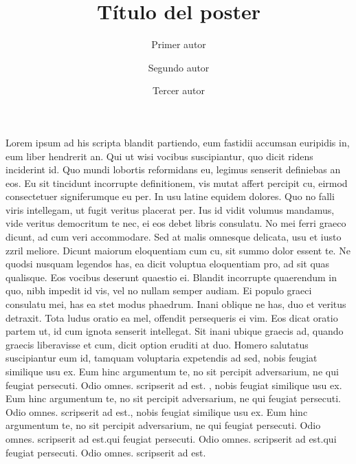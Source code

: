 \documentclass[11pt,a4paper]{article}
\title{\vspace{-5ex}Título del poster}	%
\author[1,2]{Primer autor}
\author[1]{Segundo autor}
\author[2]{Tercer autor}
\affil[1]{Afiliación uno}
\affil[2]{Afiliación dos\vspace{1ex}}	%
\affil[ ]{\texttt{email@decontacto}\vspace{-4ex}}	%
\date{}
\begin{document}
  \maketitle
  \thispagestyle{empty}

\begin{multicols}{2}

Lorem ipsum ad his scripta blandit partiendo, eum fastidii accumsan euripidis in, eum liber hendrerit an. Qui ut wisi vocibus suscipiantur, quo dicit ridens inciderint id. Quo mundi lobortis reformidans eu, legimus senserit definiebas an eos. Eu sit tincidunt incorrupte definitionem, vis mutat affert percipit cu, eirmod consectetuer signiferumque eu per. In usu latine equidem dolores. Quo no falli viris intellegam, ut fugit veritus placerat per. Ius id vidit volumus mandamus, vide veritus democritum te nec, ei eos debet libris consulatu. No mei ferri graeco dicunt, ad cum veri accommodare. Sed at malis omnesque delicata, usu et iusto zzril meliore. Dicunt maiorum eloquentiam cum cu, sit summo dolor essent te. Ne quodsi nusquam legendos has, ea dicit voluptua eloquentiam pro, ad sit quas qualisque. Eos vocibus deserunt quaestio ei. Blandit incorrupte quaerendum in quo, nibh impedit id vis, vel no nullam semper audiam. Ei populo graeci consulatu mei, has ea stet modus phaedrum. Inani oblique ne has, duo et 
veritus detraxit. Tota ludus oratio ea mel, offendit persequeris ei vim. Eos dicat oratio partem ut, id cum ignota senserit intellegat. Sit inani ubique graecis ad, quando graecis liberavisse et cum, dicit option eruditi at duo. Homero salutatus suscipiantur eum id, tamquam voluptaria expetendis ad sed, nobis feugiat similique usu ex. Eum hinc argumentum te, no sit percipit adversarium, ne qui feugiat persecuti. Odio omnes. scripserit ad est. , nobis feugiat similique usu ex. Eum hinc argumentum te, no sit percipit adversarium, ne qui feugiat persecuti. Odio omnes. scripserit ad est., nobis feugiat similique usu ex. Eum hinc argumentum te, no sit percipit adversarium, ne qui feugiat persecuti. Odio omnes. scripserit ad est.qui feugiat persecuti. Odio omnes. scripserit ad est.qui feugiat persecuti. Odio omnes. scripserit ad est.


\end{multicols}
\end{document}
